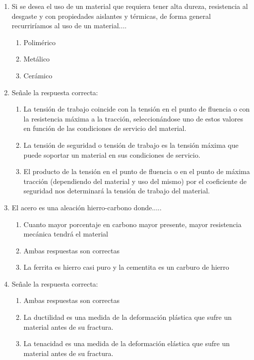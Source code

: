 \begin{enumerate}[label=\textbf{\arabic*.}]
    \item Si se desea el uso de un material que requiera tener alta dureza, resistencia al desgaste y con propiedades aislantes y térmicas, de forma general recurriríamos al uso de un material....
          \begin{enumerate}[label=\alph*.]
              \item Polimérico
              \item Metálico
              \item \textcolor{red!85!black}{Cerámico}
          \end{enumerate}

    \item Señale la respuesta correcta:
          \begin{enumerate}[label=\alph*.]
              \item La tensión de trabajo coincide con la tensión en el punto de fluencia o con la resistencia máxima a la tracción, seleccionándose uno de estos valores en función de las condiciones de servicio del material.
              \item \textcolor{red!85!black}{La tensión de seguridad o tensión de trabajo es la tensión máxima que puede soportar un material en sus condiciones de servicio.}
              \item El producto de la tensión en el punto de fluencia o en el punto de máxima tracción (dependiendo del material y uso del mismo) por el coeficiente de seguridad nos determinará la tensión de trabajo del material.
          \end{enumerate}

    \item El acero es una aleación hierro-carbono donde.....
          \begin{enumerate}[label=\alph*.]
              \item Cuanto mayor porcentaje en carbono mayor presente, mayor resistencia mecánica tendrá el material
              \item \textcolor{red!85!black}{Ambas respuestas son correctas}
              \item La ferrita es hierro casi puro y la cementita es un carburo de hierro
          \end{enumerate}

    \item Señale la respuesta correcta:
          \begin{enumerate}[label=\alph*.]
              \item Ambas respuestas son correctas
              \item \textcolor{red!85!black}{La ductilidad es una medida de la deformación plástica que sufre un material antes de su fractura.}
              \item La tenacidad es una medida de la deformación elástica que sufre un material antes de su fractura.
          \end{enumerate}


\end{enumerate}
